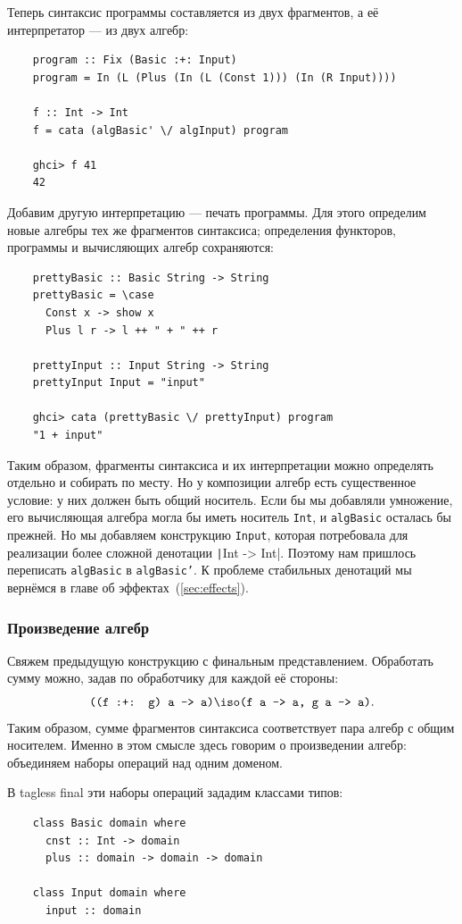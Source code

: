 Теперь синтаксис программы составляется из двух фрагментов, а её интерпретатор --- из двух алгебр:
\begin{verbatim}
    program :: Fix (Basic :+: Input)
    program = In (L (Plus (In (L (Const 1))) (In (R Input))))

    f :: Int -> Int
    f = cata (algBasic' \/ algInput) program

    ghci> f 41
    42
\end{verbatim}

Добавим другую интерпретацию --- печать программы.
Для этого определим новые алгебры тех же фрагментов синтаксиса; определения функторов, программы и вычисляющих алгебр сохраняются:
\begin{verbatim}
    prettyBasic :: Basic String -> String
    prettyBasic = \case
      Const x -> show x
      Plus l r -> l ++ " + " ++ r

    prettyInput :: Input String -> String
    prettyInput Input = "input"

    ghci> cata (prettyBasic \/ prettyInput) program
    "1 + input"
\end{verbatim}

Таким образом, фрагменты синтаксиса и их интерпретации можно определять отдельно и собирать по месту.
Но у композиции алгебр есть существенное условие: у них должен быть общий носитель.
Если бы мы добавляли умножение, его вычисляющая алгебра могла бы иметь носитель \texttt{Int}, и \texttt{algBasic} осталась бы прежней.
Но мы добавляем конструкцию \texttt{Input}, которая потребовала для реализации более сложной денотации \texttt|Int -> Int|.
Поэтому нам пришлось переписать \texttt{algBasic} в \texttt{algBasic'}.
К проблеме стабильных денотаций мы вернёмся в главе об эффектах~(\ref{sec:effects}).

\subsubsection{Произведение алгебр} \label{subsubsec:prod-algebras}

Свяжем предыдущую конструкцию с финальным представлением.
Обработать сумму можно, задав по обработчику для каждой её стороны:
\[
    \texttt{((f :+: g) a -> a)} \iso
    \texttt{(f a -> a, g a -> a)}.
\]
Таким образом, сумме фрагментов синтаксиса соответствует пара алгебр с общим носителем.
Именно в этом смысле здесь говорим о произведении алгебр: объединяем наборы операций над одним доменом.

В tagless final эти наборы операций зададим классами типов:
\begin{verbatim}
    class Basic domain where
      cnst :: Int -> domain
      plus :: domain -> domain -> domain

    class Input domain where
      input :: domain
\end{verbatim}

